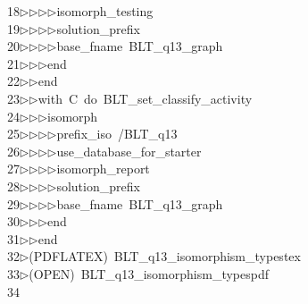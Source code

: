 \begin{tabbing}
18\>$\triangleright$\>$\triangleright$\>$\triangleright$\>$\triangleright$\>isomorph\_testing\ \\[0pt]
19\>$\triangleright$\>$\triangleright$\>$\triangleright$\>$\triangleright$\>solution\_prefix\ \ \\[0pt]
20\>$\triangleright$\>$\triangleright$\>$\triangleright$\>$\triangleright$\>base\_fname\ BLT\_q13\_graph\ \\[0pt]
21\>$\triangleright$\>$\triangleright$\>$\triangleright$\>end\ \\[0pt]
22\>$\triangleright$\>$\triangleright$\>end\ \\[0pt]
23\>$\triangleright$\>$\triangleright$\>with\ C\ do\ BLT\_set\_classify\_activity\ \\[0pt]
24\>$\triangleright$\>$\triangleright$\>$\triangleright$\>isomorph\ \\[0pt]
25\>$\triangleright$\>$\triangleright$\>$\triangleright$\>$\triangleright$\>prefix\_iso\ /BLT\_q13\ \\[0pt]
26\>$\triangleright$\>$\triangleright$\>$\triangleright$\>$\triangleright$\>use\_database\_for\_starter\ \\[0pt]
27\>$\triangleright$\>$\triangleright$\>$\triangleright$\>$\triangleright$\>isomorph\_report\ \\[0pt]
28\>$\triangleright$\>$\triangleright$\>$\triangleright$\>$\triangleright$\>solution\_prefix\ \ \\[0pt]
29\>$\triangleright$\>$\triangleright$\>$\triangleright$\>$\triangleright$\>base\_fname\ BLT\_q13\_graph\ \\[0pt]
30\>$\triangleright$\>$\triangleright$\>$\triangleright$\>end\ \\[0pt]
31\>$\triangleright$\>$\triangleright$\>end\\[0pt]
32\>$\triangleright$\>(PDFLATEX)\ BLT\_q13\_isomorphism\_typestex\\[0pt]
33\>$\triangleright$\>(OPEN)\ BLT\_q13\_isomorphism\_typespdf\\[0pt]
34\>\end{tabbing}
